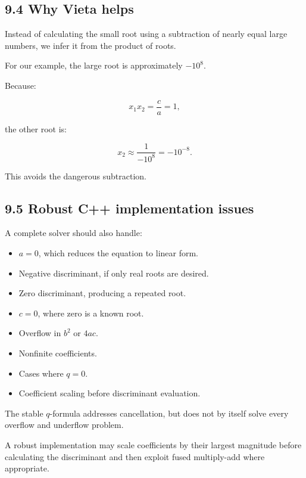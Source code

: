 \subsection{9.4 Why Vieta helps}\label{02-foundations-ii-ch028-why-vieta-helps}

\hypertarget{02-foundations-ii-ch028-why-vieta-helps}{}

Instead of calculating the small root using a subtraction of nearly equal large numbers, we infer it from the product of roots.

For our example, the large root is approximately \(-10^8\).

Because:

\[ x_1x_2=\frac ca=1, \]

the other root is:

\[ x_2\approx\frac1{-10^8}=-10^{-8}. \]

This avoids the dangerous subtraction.

\subsection{9.5 Robust C++ implementation issues}\label{02-foundations-ii-ch028-robust-c-implementation-issues}

\hypertarget{02-foundations-ii-ch028-robust-c-implementation-issues}{}

A complete solver should also handle:

\begin{itemize}
\tightlist
\item
  \(a=0\), which reduces the equation to linear form.
\item
  Negative discriminant, if only real roots are desired.
\item
  Zero discriminant, producing a repeated root.
\item
  \(c=0\), where zero is a known root.
\item
  Overflow in \(b^2\) or \(4ac\).
\item
  Nonfinite coefficients.
\item
  Cases where \(q=0\).
\item
  Coefficient scaling before discriminant evaluation.
\end{itemize}

The stable \(q\)-formula addresses cancellation, but does not by itself solve every overflow and underflow problem.

A robust implementation may scale coefficients by their largest magnitude before calculating the discriminant and then exploit fused multiply-add where appropriate.

